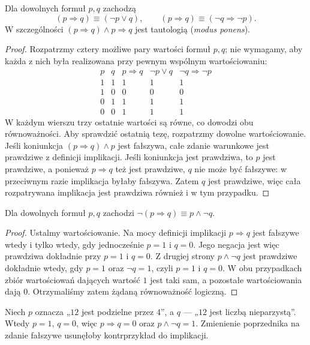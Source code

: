 \begin{twierdzenie}
\label{thm:implication-laws}
Dla dowolnych formuł $p,q$ zachodzą
\[
(p\Rightarrow q)\equiv(\neg p\lor q),\qquad
(p\Rightarrow q)\equiv(\neg q\Rightarrow\neg p).
\]
W szczególności $(p\Rightarrow q)\land p\Rightarrow q$
jest tautologią (\emph{modus ponens}).
\end{twierdzenie}
\begin{proof}
Rozpatrzmy cztery możliwe pary wartości formuł $p,q$;
nie wymagamy, aby każda z nich była realizowana przy pewnym
wspólnym wartościowaniu:
\[
\begin{array}{cc|ccc}
p&q&p\Rightarrow q&\neg p\lor q&\neg q\Rightarrow\neg p\\\hline
1&1&1&1&1\\
1&0&0&0&0\\
0&1&1&1&1\\
0&0&1&1&1
\end{array}
\]
W każdym wierszu trzy ostatnie wartości są równe, co
dowodzi obu równoważności. Aby sprawdzić ostatnią tezę,
rozpatrzmy dowolne wartościowanie. Jeśli koniunkcja
$(p\Rightarrow q)\land p$ jest fałszywa, całe zdanie
warunkowe jest prawdziwe z definicji implikacji.
Jeśli koniunkcja jest prawdziwa, to $p$ jest prawdziwe,
a ponieważ $p\Rightarrow q$ też jest prawdziwe, $q$
nie może być fałszywe: w przeciwnym razie implikacja
byłaby fałszywa. Zatem $q$ jest prawdziwe, więc
cała rozpatrywana implikacja jest prawdziwa również
i w tym przypadku.
\end{proof}

\begin{twierdzenie}\label{thm:negated-implication-xli}
Dla dowolnych formuł $p,q$ zachodzi
$\neg(p\Rightarrow q)\equiv p\land\neg q$.
\end{twierdzenie}
\begin{proof}
Ustalmy wartościowanie. Na mocy definicji implikacji
$p\Rightarrow q$ jest fałszywe wtedy i tylko wtedy,
gdy jednocześnie $p=1$ i $q=0$. Jego negacja jest
więc prawdziwa dokładnie przy $p=1$ i $q=0$.
Z drugiej strony $p\land\neg q$ jest prawdziwe
dokładnie wtedy, gdy $p=1$ oraz $\neg q=1$,
czyli $p=1$ i $q=0$. W obu przypadkach zbiór
wartościowań dających wartość $1$ jest taki sam,
a pozostałe wartościowania dają $0$. Otrzymaliśmy zatem
żądaną równoważność logiczną.
\end{proof}

\begin{przyklad}
Niech $p$ oznacza „$12$ jest podzielne przez $4$”,
a $q$ --- „$12$ jest liczbą nieparzystą”. Wtedy
$p=1$, $q=0$, więc $p\Rightarrow q=0$ oraz
$p\land\neg q=1$. Zmienienie poprzednika na
zdanie fałszywe usunęłoby kontrprzykład do implikacji.
\end{przyklad}

